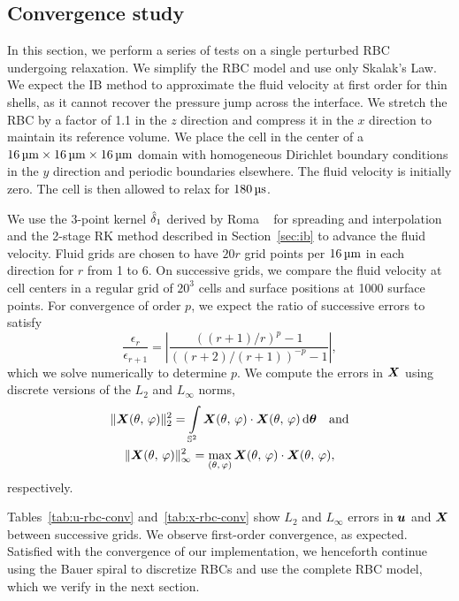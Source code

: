 \subsection{Convergence study}\label{sec:convergence}

In this section, we perform a series of tests on a single perturbed RBC undergoing
relaxation. We simplify the RBC model and use only Skalak's Law. We expect the IB method
to approximate the fluid velocity at first order for thin shells, as it cannot recover
the pressure jump across the interface. We stretch the RBC by a factor of 1.1 in the $z$
direction and compress it in the $x$ direction to maintain its reference volume. We place
the cell in the center of a $16\um\times16\um\times16\um$ domain with homogeneous
Dirichlet boundary conditions in the $y$ direction and periodic boundaries elsewhere. The
fluid velocity is initially zero. The cell is then allowed to relax for $180\us$.

We use the 3-point kernel $\hat{\delta}_1$ derived by Roma ~%
\cite{Roma:1999tx} for spreading and interpolation and the 2-stage RK method described in
Section~\ref{sec:ib} to advance the fluid velocity. Fluid grids are chosen to have $20r$
grid points per $16\um$ in each direction for $r$ from 1 to 6. On successive grids, we
compare the fluid velocity at cell centers in a regular grid of $20^3$ cells and surface
positions at 1000 surface points. For convergence of order $p$, we expect the ratio of
successive errors to satisfy
\begin{equation}
    \frac{\epsilon_r}{\epsilon_{r+1}} = \left|\frac{((r+1)/r)^p-1}{((r+2)/(r+1))^{-p}-1}\right|,
\end{equation}
which we solve numerically to determine $p$. We compute the errors in $\boldsymbol{X}$ using discrete
versions of the $L_2$ and $L_\infty$ norms,
\begin{gather}
    \|\X(\theta,\,\varphi)\|_2^2 =
    \int\limits_{\sphere} \X(\theta,\,\varphi)\cdot\X(\theta,\,\varphi) \d\qs \quad\text{and} \\
    \|\X(\theta,\,\varphi)\|_\infty^2 =
    \max_{(\theta,\,\varphi)} \X(\theta,\,\varphi)\cdot\X(\theta,\,\varphi),
\end{gather}
respectively.

Tables~\ref{tab:u-rbc-conv} and~\ref{tab:x-rbc-conv} show $L_2$ and $L_\infty$ errors in
$\boldsymbol{u}$ and $\boldsymbol{X}$ between successive grids. We observe first-order convergence, as expected.
Satisfied with the convergence of our implementation, we henceforth continue using the
Bauer spiral to discretize RBCs and use the complete RBC model, which we verify in the
next section.

